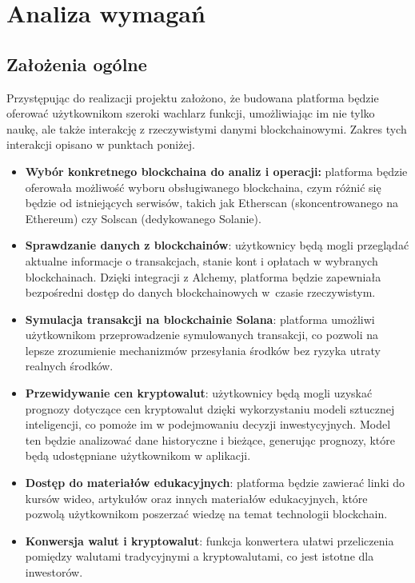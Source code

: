 \chapter{Analiza wymagań}
\section{Założenia ogólne}

Przystępując do realizacji projektu założono, że budowana platforma będzie oferować użytkownikom szeroki wachlarz funkcji, umożliwiając im nie tylko naukę, ale także interakcję z rzeczywistymi danymi blockchainowymi. Zakres tych interakcji opisano w punktach poniżej.
\begin{itemize}
\item \textbf{Wybór konkretnego blockchaina do analiz i operacji:} platforma będzie oferowała możliwość wyboru obsługiwanego blockchaina, czym różnić się będzie od istniejących serwisów, takich jak Etherscan (skoncentrowanego na Ethereum) czy Solscan (dedykowanego Solanie).
\item \textbf{Sprawdzanie danych z blockchainów}: użytkownicy będą mogli przeglądać aktualne informacje o transakcjach, stanie kont i opłatach w wybranych blockchainach. Dzięki integracji z Alchemy, platforma będzie zapewniała bezpośredni dostęp do danych blockchainowych w~czasie rzeczywistym. 
\item \textbf{Symulacja transakcji na blockchainie Solana}: platforma umożliwi użytkownikom przeprowadzenie symulowanych transakcji, co pozwoli na lepsze zrozumienie mechanizmów przesyłania środków bez ryzyka utraty realnych środków. 
\item \textbf{Przewidywanie cen kryptowalut}: użytkownicy będą mogli uzyskać prognozy dotyczące cen kryptowalut dzięki wykorzystaniu modeli sztucznej inteligencji, co pomoże im w podejmowaniu decyzji inwestycyjnych. Model ten będzie analizować dane historyczne i bieżące, generując prognozy, które będą udostępniane użytkownikom w aplikacji.
\item \textbf{Dostęp do materiałów edukacyjnych}: platforma będzie zawierać linki do kursów wideo, artykułów oraz innych materiałów edukacyjnych, które pozwolą użytkownikom poszerzać wiedzę na temat technologii blockchain. 
\item \textbf{Konwersja walut i kryptowalut}: funkcja konwertera ułatwi przeliczenia pomiędzy walutami tradycyjnymi a kryptowalutami, co jest istotne dla inwestorów. 
\end{itemize}
